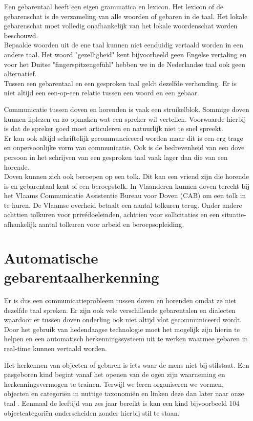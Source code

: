 \npar Een gebarentaal heeft een eigen grammatica en lexicon. Het lexicon of de gebarenschat is de verzameling van alle woorden of gebaren in de taal. Het lokale gebarenschat moet volledig onafhankelijk van het lokale woordenschat worden beschouwd.
\\Bepaalde woorden uit de ene taal kunnen niet eenduidig vertaald worden in een andere taal. Het woord "gezelligheid" kent bijvoorbeeld geen Engelse vertaling en voor het Duitse "fingerspitzengef\"uhl" hebben we in de Nederlandse taal ook geen alternatief.
\\Tussen een gebarentaal en een gesproken taal geldt dezelfde verhouding. Er is niet altijd een een-op-een relatie tussen een woord en een gebaar.

\npar Communicatie tussen doven en horenden is vaak een struikelblok. Sommige doven kunnen liplezen en zo opmaken wat een spreker wil vertellen. Voorwaarde hierbij is dat de spreker goed moet articuleren en natuurlijk niet te snel spreekt.
\\ Er kan ook altijd schriftelijk gecommunciceerd worden maar dit is een erg trage en onpersoonlijke vorm van communicatie. Ook is de bedrevenheid van een dove persoon in het schrijven van een gesproken taal vaak lager dan die van een horende.
\\ Doven kunnen zich ook beroepen op een tolk. Dit kan een vriend zijn die horende is en gebarentaal kent of een beroepstolk. In Vlaanderen kunnen doven terecht bij het Vlaams Communicatie Assistentie Bureau voor Doven (CAB) om een tolk in te huren. \cite{tolkuren} De Vlaamse overheid betaalt een aantal tolkuren terug. Onder andere achttien tolkuren voor priv\'edoeleinden, achttien voor sollicitaties en een situatie-afhankelijk aantal tolkuren voor arbeid en beroepsopleiding.
 
\section{Automatische gebarentaalherkenning}
Er is dus een communicatieprobleem tussen doven en horenden omdat ze niet dezelfde taal spreken. Er zijn ook vele verschillende gebarentalen en dialecten waardoor er tussen doven onderling ook niet altijd vlot gecommuniceerd wordt.
Door het gebruik van hedendaagse technologie moet het mogelijk zijn hierin te helpen en een automatisch herkenningssysteem uit te werken waarmee gebaren in real-time kunnen vertaald worden.

\npar Het herkennen van objecten of gebaren is iets waar de mens niet bij stilstaat. Een pasgeboren kind begint vanaf het openen van de ogen zijn waarneming en herkenningsvermogen te trainen. Terwijl we leren organiseren we vormen, objecten en categori\"en in nuttige taxonomi\"en en linken deze dan later naar onze taal \cite{oneshot-object-cat}. Eenmaal de leeftijd van zes jaar bereikt is kan een kind bijvoorbeeld 104 objectcategori\"en onderscheiden zonder hierbij stil te staan.

